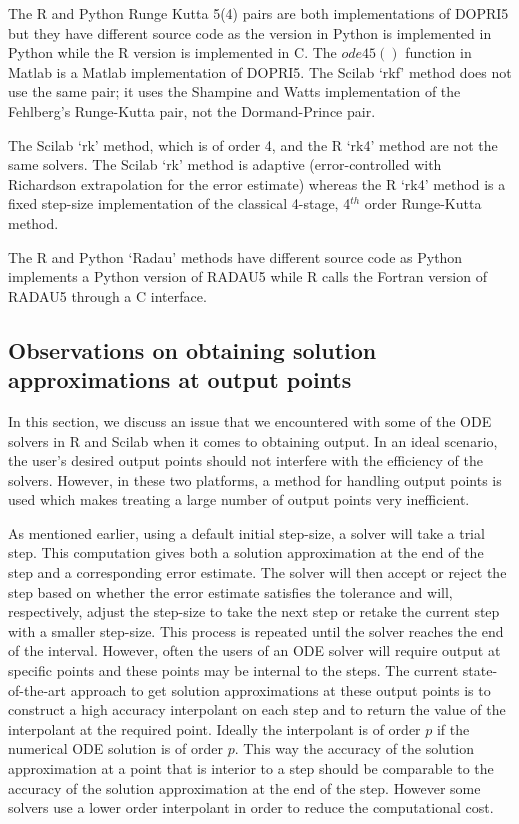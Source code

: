 The R and Python Runge Kutta 5(4) pairs are both implementations of DOPRI5 but they have different source code as the version in Python is implemented in Python while the R version is implemented in C. The $ode45()$ function in Matlab is a Matlab implementation of DOPRI5. The Scilab `rkf' method does not use the same pair; it uses the Shampine and Watts implementation of the Fehlberg's Runge-Kutta pair, not the Dormand-Prince pair. 

The Scilab `rk' method, which is of order 4, and the R `rk4' method are not the same solvers. The Scilab `rk' method is adaptive (error-controlled with Richardson extrapolation for the error estimate) whereas the R `rk4' method is a fixed step-size implementation of the classical 4-stage, 4$^{th}$ order Runge-Kutta method.

The R and Python `Radau' methods have different source code as Python implements a Python version of RADAU5 while R calls the Fortran version of RADAU5 through a C interface.

\subsection{Observations on obtaining solution approximations at output points}
\label{subsection:solution_output_points_impl}
In this section, we discuss an issue that we encountered with some of the ODE solvers in R and Scilab when it comes to obtaining output. In an ideal scenario, the user's desired output points should not interfere with the efficiency of the solvers. However, in these two platforms, a method for handling output points is used which makes treating a large number of output points very inefficient.

As mentioned earlier, using a default initial step-size, a solver will take a trial step. This computation gives both a solution approximation at the end of the step and a corresponding error estimate. The solver will then accept or reject the step based on whether the error estimate satisfies the tolerance and will, respectively, adjust the step-size to take the next step or retake the current step with a smaller step-size. This process is repeated until the solver reaches the end of the interval. However, often the users of an ODE solver will require output at specific points and these points may be internal to the steps. The current state-of-the-art approach to get solution approximations at these output points is to construct a high accuracy interpolant on each step and to return the value of the interpolant at the required point. Ideally the interpolant is of order $p$ if the numerical ODE solution is of order $p$. This way the accuracy of the solution approximation at a point that is interior to a step should be comparable to the accuracy of the solution approximation at the end of the step. However some solvers use a lower order interpolant in order to reduce the computational cost.

